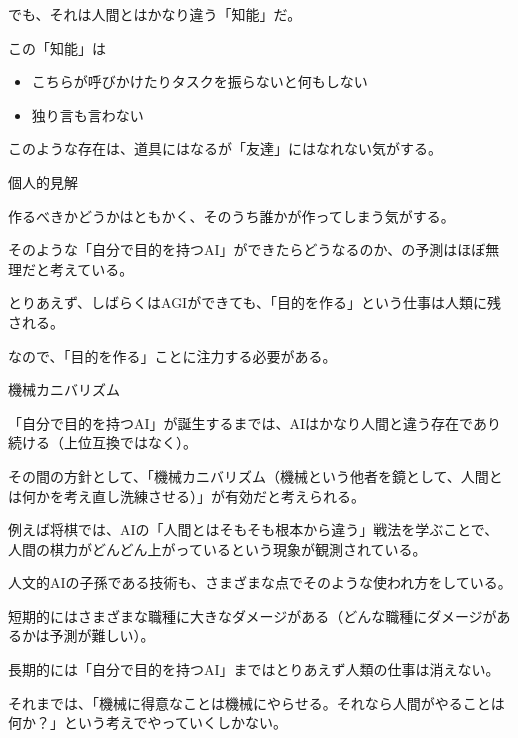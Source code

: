 \documentclass[12pt, unicode]{beamer}
\begin{document}
\begin{frame}

でも、それは人間とはかなり違う「知能」だ。

この「知能」は

\begin{itemize}
\item こちらが呼びかけたりタスクを振らないと何もしない
\item 独り言も言わない
\end{itemize}

このような存在は、道具にはなるが「友達」にはなれない気がする。

\end{frame}

\begin{frame}{個人的見解}

作るべきかどうかはともかく、そのうち誰かが作ってしまう気がする。

そのような「自分で目的を持つAI」ができたらどうなるのか、の予測はほぼ無理だと考えている。

\end{frame}

\begin{frame}

とりあえず、しばらくはAGIができても、「目的を作る」という仕事は人類に残される。

なので、「目的を作る」ことに注力する必要がある。

\end{frame}

\begin{frame}{機械カニバリズム}

「自分で目的を持つAI」が誕生するまでは、AIはかなり人間と違う存在であり続ける（上位互換ではなく）。

その間の方針として、「機械カニバリズム（機械という他者を鏡として、人間とは何かを考え直し洗練させる）」が有効だと考えられる。

例えば将棋では、AIの「人間とはそもそも根本から違う」戦法を学ぶことで、人間の棋力がどんどん上がっているという現象が観測されている。

人文的AIの子孫である技術も、さまざまな点でそのような使われ方をしている。

\end{frame}

\begin{frame}

短期的にはさまざまな職種に大きなダメージがある（どんな職種にダメージがあるかは予測が難しい）。

長期的には「自分で目的を持つAI」まではとりあえず人類の仕事は消えない。

それまでは、「機械に得意なことは機械にやらせる。それなら人間がやることは何か？」という考えでやっていくしかない。

\end{frame}
\end{document}
